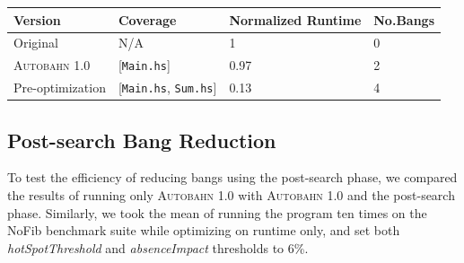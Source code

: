\documentclass[format=sigplan, review=true]{acmart}
\newcommand{\hotspots}[0]{hot spots}
\newcommand{\hotspotcost}[0]{\textit{hotSpotThreshold}}
\newcommand{\Ao}[0]{\textsc{Autobahn 1.0}}
\newcommand{\preopt}[0]{pre-search}
\newcommand{\postopt}[0]{post-search}
\newcommand{\Postopt}[0]{Post-search}
\newcommand{\absim}[0]{\textit{absenceImpact}}
\begin{document}


\begin{tabular}{p{2.5cm}p{1.5cm}p{2cm}p{1cm}}
\hline
Version   & Coverage & Normalized Runtime & No.Bangs \\
\hline
Original      & N/A   &   1	 & 0   \\
\Ao{}       & [\texttt{Main.hs}]      & 0.97    &  2\\
Pre-optimization	& [\texttt{Main.hs}, \texttt{Sum.hs}]         & 0.13      & 4\\
\hline
\end{tabular}


\subsection{\Postopt{} Bang Reduction}

To test the efficiency of reducing bangs using the \postopt{} phase, we compared the results of running only \Ao{} with \Ao{} and the \postopt{} phase. Similarly, we took the mean of running the program ten times on the NoFib benchmark suite while optimizing on runtime only, and set both \hotspotcost{} and \absim{} thresholds to 6\%. 
\end{document}
